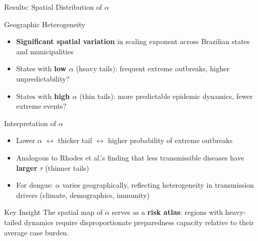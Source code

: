 \documentclass[10pt,aspectratio=169]{beamer}
\begin{document}
\begin{frame}{Results: Spatial Distribution of $\alpha$}
\begin{block}{Geographic Heterogeneity}
\begin{itemize}
    \item \textbf{Significant spatial variation} in scaling exponent across Brazilian states and municipalities
    \item States with \textbf{low $\alpha$} (heavy tails): frequent extreme outbreaks, higher unpredictability?
    \item States with \textbf{high $\alpha$} (thin tails): more predictable epidemic dynamics, fewer extreme events?
\end{itemize}
\end{block}

\vspace{0.3cm}

\begin{block}{Interpretation of $\alpha$}
\begin{itemize}
    \item Lower $\alpha$ $\leftrightarrow$ thicker tail $\leftrightarrow$ higher probability of extreme outbreaks
    \item Analogous to Rhodes et al.'s finding that less transmissible diseases have \textbf{larger} $\tau$ (thinner tails)
    \item For dengue: $\alpha$ varies geographically, reflecting heterogeneity in transmission drivers (climate, demographics, immunity)
\end{itemize}
\end{block}

\begin{alertblock}{Key Insight}
The spatial map of $\alpha$ serves as a \textbf{risk atlas}: regions with heavy-tailed dynamics require disproportionate preparedness capacity relative to their average case burden.
\end{alertblock}
\end{frame}
\end{document}
